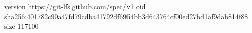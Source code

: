 version https://git-lfs.github.com/spec/v1
oid sha256:401782c90a47fd79cdba41792df6954bb3d643764cf00ed27bd1af9dab814f88
size 117100

